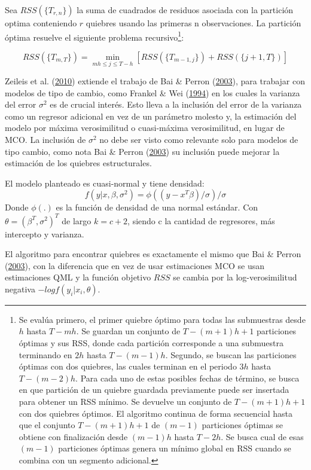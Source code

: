 \documentclass[12pt,oneside]{reedthesis}
\begin{document}
Sea \(RSS(\{T_{r,n}\})\) la suma de cuadrados de residuos asociada con la partición optima conteniendo \(r\) quiebres usando las primeras n observaciones. La partición óptima resuelve el siguiente problema recursivo\footnote{Se evalúa primero, el primer quiebre óptimo para todas las submuestras desde \(h\) hasta \(T-mh\). Se guardan un conjunto de \(T-(m+1)h+1\) particiones óptimas y sus RSS, donde cada partición corresponde a una submuestra terminando en \(2h\) hasta \(T-(m-1)h\).
  Segundo, se buscan las particiones óptimas con dos quiebres, las cuales terminan en el periodo \(3h\) hasta \(T-(m-2)h\). Para cada uno de estas posibles fechas de término, se busca en que partición de un quiebre guardada previamente puede ser insertada para obtener un RSS mínimo. Se devuelve un conjunto de \(T-(m+1)h+1\) con dos quiebres óptimos. El algoritmo continua de forma secuencial hasta que el conjunto \(T-(m+1)h+1\) de \((m-1)\) particiones óptimas se obtiene con finalización desde \((m-1)h\) hasta \(T-2h\). Se busca cual de esas \((m-1)\) particiones óptimas genera un mínimo global en RSS cuando se combina con un segmento adicional.}:

\[
RSS(\{T_{m,T}\}) = \min_{mh\leq j\leq T-h}[RSS(\{T_{m-1,j}\}) + RSS(\{j+1, T\})]
\]

Zeileis et al. (\protect\hyperlink{ref-Zeileis2010}{2010}) extiende el trabajo de Bai \& Perron (\protect\hyperlink{ref-BaiPerron2003}{2003}), para trabajar con modelos de tipo de cambio, como Frankel \& Wei (\protect\hyperlink{ref-Frankel1994}{1994}) en los cuales la varianza del error \(\sigma^2\) es de crucial interés. Esto lleva a la inclusión del error de la varianza como un regresor adicional en vez de un parámetro molesto y, la estimación del modelo por máxima verosimilitud o cuasi-máxima verosimilitud, en lugar de MCO. La inclusión de \(\sigma^2\) no debe ser visto como relevante solo para modelos de tipo cambio, como nota Bai \& Perron (\protect\hyperlink{ref-BaiPerron2003}{2003}) su inclusión puede mejorar la estimación de los quiebres estructurales.

El modelo planteado es cuasi-normal y tiene densidad:
\[
f(y|x,\beta, \sigma^2) = \phi((y-x^T\beta)/\sigma)/\sigma
\]
Donde \(\phi(.)\) es la función de densidad de una normal estándar. Con \(\theta = (\beta^T, \sigma^2)^T\) de largo \(k = c +2\), siendo c la cantidad de regresores, más intercepto y varianza.

El algoritmo para encontrar quiebres es exactamente el mismo que Bai \& Perron (\protect\hyperlink{ref-BaiPerron2003}{2003}), con la diferencia que en vez de usar estimaciones MCO se usan estimaciones QML y la función objetivo \(RSS\) se cambia por la log-verosimilitud negativa \(-logf(y_i|x_i, \theta)\).
\end{document}
